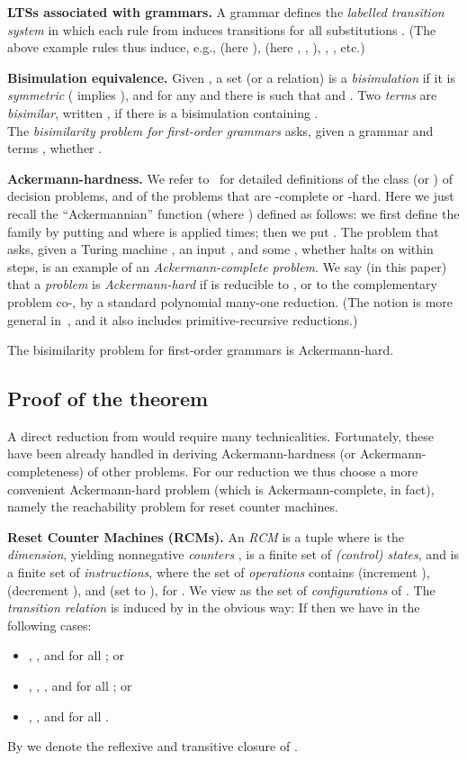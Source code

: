 \documentclass[a4paper,11pt]{article}
\begin{document}
\textbf{LTSs associated with grammars.}
A grammar  defines the \emph{labelled
transition system} 
in which each rule  from  induces 
transitions 
 for all substitutions
.
(The above example rules thus induce, e.g., 
 (here ),
 (here
, , ),
, ,
etc.)

\textbf{Bisimulation equivalence.}
Given , a set (or a relation)
 is a
\emph{bisimulation} if it is \emph{symmetric} ( implies
), and for any  and  there is
 such that   and .
Two \emph{terms}  are \emph{bisimilar}, written , if there is a
bisimulation containing .
\\
The \emph{bisimilarity problem for first-order grammars} asks, given a grammar  and
terms , whether .


\textbf{Ackermann-hardness.}
We refer to~\cite{Schmitz2013} for detailed definitions of the class
  (or )
of decision problems, and of the problems that are 
-complete
or -hard.
Here we just recall the ``Ackermannian'' function
 (where ) defined as
follows: we first define  the family  
by putting  and 
where  is applied  times; then we put .
The problem  that asks,
given a Turing machine , an input , and some
, whether  halts on  within  steps, is an
example of an \emph{Ackermann-complete problem}. 
We say (in this paper) that a \emph{problem}
 is
\emph{Ackermann-hard} if  is reducible 
to , or to the complementary problem co-, 
by a standard polynomial
many-one reduction.
(The notion is more general in~\cite{Schmitz2013}, and it also 
includes primitive-recursive reductions.)

\begin{theorem}\label{th:bisackhard}
The bisimilarity problem for
first-order grammars is Ackermann-hard. 
\end{theorem}


\subsection*{Proof of the theorem}

A direct reduction from  would require many
technicalities. Fortunately, these have been already handled in 
deriving  Ackermann-hardness (or Ackermann-completeness) of other
problems.
For our reduction we thus choose a more convenient
Ackermann-hard problem (which is Ackermann-complete, in
fact), namely the reachability problem for reset counter machines.

\textbf{Reset Counter Machines (RCMs).}
An \emph{RCM} is a tuple   where 
 is the \emph{dimension}, yielding  nonnegative
\emph{counters} ,
 is a
finite set of \emph{(control) states},
and  is a finite set of
\emph{instructions}, where the set 
 of \emph{operations} contains  (increment ),
 (decrement ), 
and  (set  to ),
for .
We view  
as the set  of 
\emph{configurations} of . 
The \emph{transition relation}  is
induced by  in the obvious way:
If  then we have 
in the following cases: 
\begin{itemize}
	\item
		, , and  for
		all ; or 
	\item
, , , and  for
		all ; or 
	\item
, , and  for
		all .
\end{itemize}		
By  we denote the reflexive and transitive closure of
.
\end{document}

